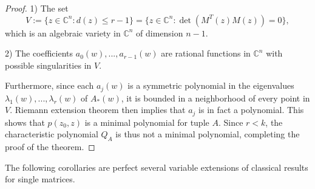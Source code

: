 \documentclass[draft, 12pt, reqno]{amsart}
\newcommand{\C}{{\mathbb C}}
\numberwithin{equation}{section}
\theoremstyle{plain}
\begin{document}
\begin{proof}
\vspace{1mm}

1) The set \[V:=\{z\in \C^n: d(z)\leq r-1\}=\{z\in \C^n: \det \left(M^T(z)M(z)\right)=0\},\] which is an algebraic variety in $\C^n$ of dimension $n-1$.

2) The coefficients $a_0(w), ..., a_{r-1}(w)$ are rational functions in $\C^n$ with possible singularities in $V$.

\vspace{1mm}

Furthermore, since each $a_j(w)$ is a symmetric polynomial in the eigenvalues $\lambda_1(w), ..., \lambda_r(w)$ of $A_*(w)$, it is bounded in a neighborhood of every point in $V$. Riemann extension theorem then implies that $a_j$ is in fact a polynomial. This shows that $p(z_0,z)$ is a minimal polynomial for tuple $A$. Since $r<k$, the characteristic polynomial $Q_A$ is thus not a minimal polynomial, completing the proof of the theorem.

\end{proof}

The following corollaries are perfect several variable extensions of classical results for single matrices.
\end{document}
